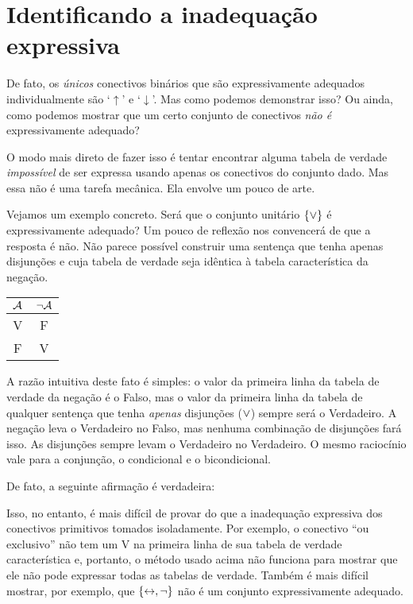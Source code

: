 \section{Identificando a inadequação expressiva}

De fato, os \emph{únicos} conectivos binários que são expressivamente adequados individualmente são `$\uparrow$' e `$\downarrow$'.
Mas como podemos demonstrar isso?
Ou ainda, como podemos mostrar que um certo conjunto de conectivos \emph{não é} expressivamente adequado?
 
O modo mais direto de fazer isso é tentar encontrar alguma tabela de verdade \emph{impossível} de ser expressa usando apenas os conectivos do conjunto dado.
Mas essa não é uma tarefa mecânica.
Ela envolve um pouco de arte.

Vejamos um exemplo concreto.
Será que o conjunto unitário $\{\vee\}$ é expressivamente adequado?
Um pouco de reflexão nos convencerá de que a resposta é não.
Não parece possível construir uma sentença que tenha apenas disjunções e cuja tabela de verdade seja idêntica à tabela característica da negação.
				\begin{center}
				\begin{tabular}{c | c}
				$\mathcal{A}$ & $\neg \mathcal{A}$\\
				\hline
				 V & F \\
				 F & V
				\end{tabular}
				\end{center}
A razão intuitiva deste fato é simples: o valor da primeira linha da tabela de verdade da negação é o Falso, mas o valor da primeira linha da tabela de qualquer sentença que tenha \emph{apenas} disjunções ($\vee$) sempre será o Verdadeiro.
A negação leva o Verdadeiro no Falso, mas nenhuma combinação de disjunções fará isso.
As disjunções sempre levam o Verdadeiro no Verdadeiro.
O mesmo raciocínio vale para a conjunção, o condicional e o bicondicional.

De fato, a seguinte afirmação é verdadeira:        
        

Isso, no entanto, é mais difícil de provar do que a inadequação expressiva dos conectivos primitivos tomados isoladamente.
Por exemplo, o conectivo ``ou exclusivo'' não tem um V na primeira linha de sua tabela de verdade característica e, portanto, o método usado acima não funciona para mostrar que ele não pode expressar todas as tabelas de verdade.
Também é mais difícil mostrar, por exemplo, que  $\{\leftrightarrow, \neg\}$ não é um conjunto expressivamente adequado.


